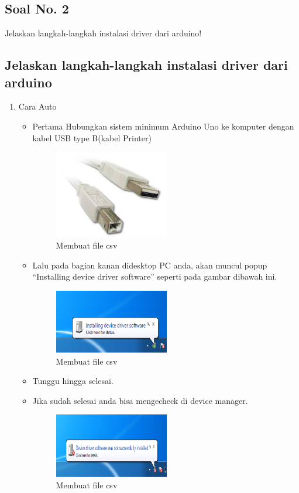\subsection{Soal No. 2}
Jelaskan langkah-langkah instalasi driver dari arduino!

\subsection{Jelaskan langkah-langkah instalasi driver dari arduino}
\begin{enumerate}
    \item Cara Auto
    \begin{itemize}
        \item Pertama Hubungkan sistem minimum Arduino Uno ke komputer dengan kabel USB type B(kabel Printer)
        \begin{figure}[H]	
            \includegraphics[width=5cm]{figures/5/1174003/teori/kabel.jpg}
            \centering
            \caption{Membuat file csv}
        \end{figure}

        \item Lalu pada bagian kanan didesktop PC anda, akan muncul popup “Installing device driver software” seperti pada gambar dibawah ini.
        \begin{figure}[H]	
            \includegraphics[width=5cm]{figures/5/1174003/teori/1.png}
            \centering
            \caption{Membuat file csv}
        \end{figure}

        \item Tunggu hingga selesai.
        \item Jika sudah selesai anda bisa mengecheck di device manager.
        \begin{figure}[H]	
            \includegraphics[width=5cm]{figures/5/1174003/teori/2.png}
            \centering
            \caption{Membuat file csv}
        \end{figure}
    \end{itemize}


\end{enumerate}
